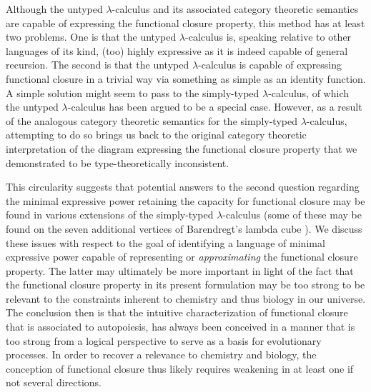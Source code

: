 \documentclass[10pt]{article}
\theoremstyle{plain}
\theoremstyle{definition}
\theoremstyle{remark}
\begin{document}
Although the untyped $\lambda$-calculus and its associated category theoretic semantics are capable of expressing the functional closure property, this method has at least two problems. One is that the untyped $\lambda$-calculus is, speaking relative to other languages of its kind, (too) highly expressive as it is indeed capable of general recursion. The second is that the untyped $\lambda$-calculus is capable of expressing functional closure in a trivial way via something as simple as an identity function. A simple solution might seem to pass to the simply-typed $\lambda$-calculus, of which the untyped $\lambda$-calculus has been argued to be a special case. However, as a result of the analogous category theoretic semantics for the simply-typed $\lambda$-calculus, attempting to do so brings us back to the original category theoretic interpretation of the diagram expressing the functional closure property that we demonstrated to be type-theoretically inconsistent.

This circularity suggests that potential answers to the second question regarding the minimal expressive power retaining the capacity for functional closure may be found in various extensions of the simply-typed $\lambda$-calculus (some of these may be found on the seven additional vertices of Barendregt's lambda cube \cite{Barendregt1985}). We discuss these issues with respect to the goal of identifying a language of minimal expressive power capable of representing or \emph{approximating} the functional closure property. The latter may ultimately be more important in light of the fact that the functional closure property in its present formulation may be too strong to be relevant to the constraints inherent to chemistry and thus biology in our universe. The conclusion then is that the intuitive characterization of functional closure that is associated to autopoiesis, has always been conceived in a manner that is too strong from a logical perspective to serve as a basis for evolutionary processes. In order to recover a relevance to chemistry and biology, the conception of functional closure thus likely requires weakening in at least one if not several directions.
\end{document}
